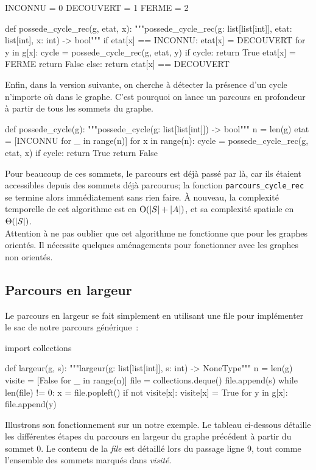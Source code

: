 \documentclass{magnolia}
\begin{document}
\begin{pythoncodeline}
INCONNU = 0
DECOUVERT = 1
FERME = 2

def possede_cycle_rec(g, etat, x):
    """possede_cycle_rec(g: list[list[int]], etat: list[int], x: int) -> bool"""
    if etat[x] == INCONNU:
        etat[x] = DECOUVERT
        for y in g[x]:
            cycle = possede_cycle_rec(g, etat, y)
            if cycle:
                return True
        etat[x] = FERME
        return False
    else:
        return etat[x] == DECOUVERT
\end{pythoncodeline}
\noindent
Enfin, dans la version suivante, on cherche à détecter la présence d'un cycle n'importe
où dans le graphe. C'est pourquoi on lance un parcours en profondeur à partir de tous
les sommets du graphe. 
\begin{pythoncodeline}
def possede_cycle(g):
    """possede_cycle(g: list[list[int]]) -> bool"""
    n = len(g)
    etat = [INCONNU for _ in range(n)]
    for x in range(n):
        cycle = possede_cycle_rec(g, etat, x)
        if cycle:
            return True
    return False
\end{pythoncodeline}
\noindent
Pour beaucoup de ces sommets, le parcours est déjà passé par là, car ils
étaient accessibles depuis des sommets déjà parcourus; la fonction
\verb!parcours_cycle_rec! se termine alors immédiatement sans rien faire. À nouveau,
la complexité temporelle de cet algorithme est en ${\rm O}(\left|S\right|+\left|A\right|)$, et sa complexité spatiale en $\Theta(\left|S\right|)$.\\

Attention à ne pas oublier que cet algorithme ne fonctionne que pour les graphes orientés.
Il nécessite quelques aménagements pour fonctionner avec les graphes non orientés.

\subsection{Parcours en largeur}

Le parcours en largeur se fait simplement en utilisant une file pour implémenter le
sac de notre parcours générique~:

\begin{pythoncodeline}
import collections

def largeur(g, s):
    """largeur(g: list[list[int]], s: int) -> NoneType""" 
    n = len(g)
    visite = [False for _ in range(n)]
    file = collections.deque()
    file.append(s)
    while len(file) != 0:
        x = file.popleft()
        if not visite[x]:
            visite[x] = True
            for y in g[x]:
                file.append(y)
\end{pythoncodeline}
\noindent
Illustrons son fonctionnement sur un notre exemple. Le tableau ci-dessous détaille
les différentes étapes du parcours en largeur du graphe précédent à partir du sommet 0.
Le contenu de la \emph{file} est détaillé lors du passage ligne 9, tout comme
l'ensemble des sommets marqués dans \emph{visité}.
\end{document}
